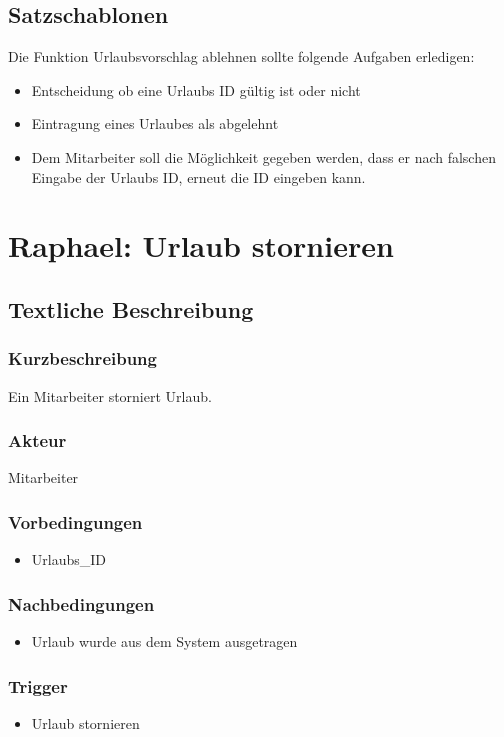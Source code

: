 \subsection{Satzschablonen}
Die Funktion Urlaubsvorschlag ablehnen sollte folgende Aufgaben erledigen:
\begin{itemize}
	\item Entscheidung ob eine Urlaubs ID gültig ist oder nicht
	\item Eintragung eines Urlaubes als abgelehnt
	\item Dem Mitarbeiter soll die Möglichkeit gegeben werden, dass er nach falschen Eingabe der Urlaubs ID, erneut die ID eingeben kann.
\end{itemize}
\section{Raphael: Urlaub stornieren}
\subsection{Textliche Beschreibung}
\subsubsection{Kurzbeschreibung}
Ein Mitarbeiter storniert Urlaub.
\subsubsection{Akteur}
Mitarbeiter
\subsubsection{Vorbedingungen}
\begin{itemize}
    \item Urlaubs\_ID
\end{itemize}
\subsubsection{Nachbedingungen}
\begin{itemize}
    \item Urlaub wurde aus dem System ausgetragen
\end{itemize}
\subsubsection{Trigger}
\begin{itemize}
    \item Urlaub stornieren
\end{itemize}

